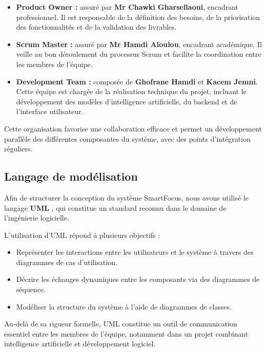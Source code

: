 \begin{itemize}
    \item \textbf{Product Owner :} assuré par \textbf{Mr Chawki Gharsellaoui}, encadrant professionnel. Il est responsable de la définition des besoins, de la priorisation des fonctionnalités et de la validation des livrables.

    \item \textbf{Scrum Master :} assuré par \textbf{Mr Hamdi Aloulou}, encadrant académique. Il veille au bon déroulement du processus Scrum et facilite la coordination entre les membres de l’équipe.

    \item \textbf{Development Team :} composée de \textbf{Ghofrane Hamdi} et \textbf{Kacem Jemni}. Cette équipe est chargée de la réalisation technique du projet, incluant le développement des modèles d’intelligence artificielle, du backend et de l’interface utilisateur.
\end{itemize}

Cette organisation favorise une collaboration efficace et permet un développement parallèle des différentes composantes du système, avec des points d’intégration réguliers.

\subsection{Langage de modélisation}

Afin de structurer la conception du système SmartFocus, nous avons utilisé le langage \textbf{\ac{UML}} \cite{omguml}, qui constitue un standard reconnu dans le domaine de l’ingénierie logicielle. 

L’utilisation d’UML répond à plusieurs objectifs :

\begin{itemize}
    \item Représenter les interactions entre les utilisateurs et le système à travers des diagrammes de cas d’utilisation.
    \item Décrire les échanges dynamiques entre les composants via des diagrammes de séquence.
    \item Modéliser la structure du système à l’aide de diagrammes de classes.
\end{itemize}

Au-delà de sa rigueur formelle, UML constitue un outil de communication essentiel entre les membres de l’équipe, notamment dans un projet combinant intelligence artificielle et développement logiciel.

